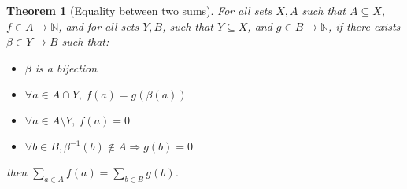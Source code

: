\documentclass[pdflatex,sn-mathphys]{sn-jnl}%
\theoremstyle{thmstyleone}%
\newtheorem{theorem}{Theorem}%
\theoremstyle{thmstyletwo}%
\theoremstyle{thmstylethree}%
\begin{document}
    \begin{theorem}[Equality between two sums]
      \label{thm:sums-equal}
      For all sets $X,A$ such that $A\subseteq{}X$,
      $f\in{}A\rightarrow\mathbb{N}$, and for all sets $Y, B$, such
      that $Y\subseteq{}X$, and $g\in{}B\rightarrow\mathbb{N}$, if
      there exists $\beta\in{}Y\rightarrow{}B$ such that:
      \begin{itemize}
      \item $\beta$ is a bijection
      \item $\forall{}a\in{}A\cap{}Y,~f(a)=g(\beta(a))$
      \item $\forall{}a\in{}A\setminus{}Y,~f(a)=0$
      \item $\forall{}b\in{}B,\beta^{-1}(b)\notin{}A\Rightarrow{}g(b)=0$
      \end{itemize}
      then $\sum\limits_{a\in{}A}f(a)=\sum\limits_{b\in{}B}g(b)$.
    \end{theorem}
\end{document}
